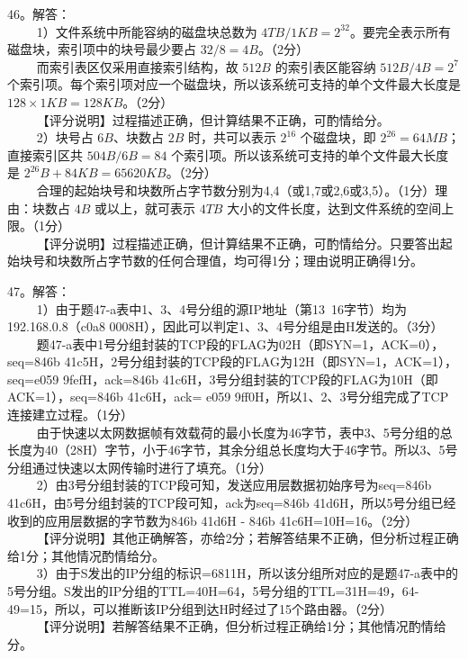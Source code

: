 46。解答： \\
$\qquad$ 1）文件系统中所能容纳的磁盘块总数为 $4TB/1KB=2^{32}$。要完全表示所有磁盘块，索引项中的块号最少要占 $32/8=4B$。（2分） \\
$\qquad$ 而索引表区仅采用直接索引结构，故 $512B$ 的索引表区能容纳 $512B/4B=2^7$ 个索引项。每个索引项对应一个磁盘块，所以该系统可支持的单个文件最大长度是 $128\times1KB=128KB$。（2分） \\
$\qquad$ 【评分说明】过程描述正确，但计算结果不正确，可酌情给分。 \\
$\qquad$ 2）块号占 $6B$、块数占 $2B$ 时，共可以表示 $2^{16}$ 个磁盘块，即 $2^{26}=64MB$；直接索引区共 $504B/6B=84$ 个索引项。所以该系统可支持的单个文件最大长度是 $2^{26}B+84KB=65620KB$。（2分） \\
$\qquad$ 合理的起始块号和块数所占字节数分别为4,4（或1,7或2,6或3,5）。（1分）理由：块数占 $4B$ 或以上，就可表示 $4TB$ 大小的文件长度，达到文件系统的空间上限。（1分） \\
$\qquad$ 【评分说明】过程描述正确，但计算结果不正确，可酌情给分。只要答出起始块号和块数所占字节数的任何合理值，均可得1分；理由说明正确得1分。

47。解答： \\
$\qquad$ 1）由于题47-a表中1、3、4号分组的源IP地址（第13~16字节）均为192.168.0.8（c0a8 0008H），因此可以判定1、3、4号分组是由H发送的。（3分） \\
$\qquad$ 题47-a表中1号分组封装的TCP段的FLAG为02H（即SYN=1，ACK=0），seq=846b 41c5H，2号分组封装的TCP段的FLAG为12H（即SYN=1，ACK=1），seq=e059 9fefH，ack=846b 41c6H，3号分组封装的TCP段的FLAG为10H（即ACK=1），seq=846b 41c6H，ack= e059 9ff0H，所以1、2、3号分组完成了TCP连接建立过程。（1分） \\
$\qquad$ 由于快速以太网数据帧有效载荷的最小长度为46字节，表中3、5号分组的总长度为40（28H）字节，小于46字节，其余分组总长度均大于46字节。所以3、5号分组通过快速以太网传输时进行了填充。（1分） \\
$\qquad$ 2）由3号分组封装的TCP段可知，发送应用层数据初始序号为seq=846b 41c6H，由5号分组封装的TCP段可知，ack为seq=846b 41d6H，所以5号分组已经收到的应用层数据的字节数为846b 41d6H - 846b 41c6H=10H=16。（2分） \\
$\qquad$ 【评分说明】其他正确解答，亦给2分；若解答结果不正确，但分析过程正确给1分；其他情况酌情给分。 \\
$\qquad$ 3）由于S发出的IP分组的标识=6811H，所以该分组所对应的是题47-a表中的5号分组。S发出的IP分组的TTL=40H=64，5号分组的TTL=31H=49，64-49=15，所以，可以推断该IP分组到达H时经过了15个路由器。（2分） \\
$\qquad$ 【评分说明】若解答结果不正确，但分析过程正确给1分；其他情况酌情给分。

